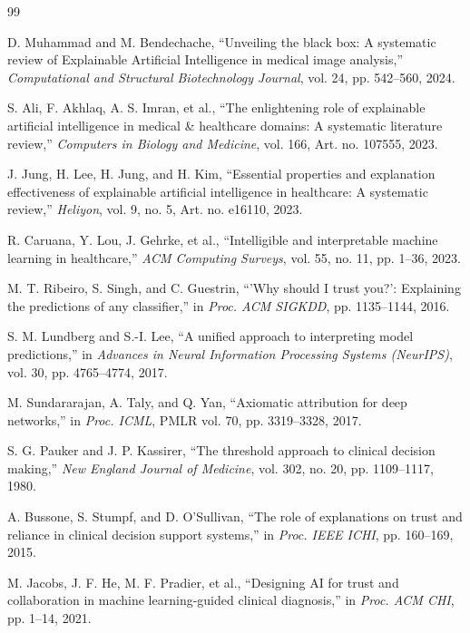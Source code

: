 \documentclass[3p,times,procedia]{elsarticle}
\theoremstyle{definition}
\begin{document}
\begin{thebibliography}{99}

D. Muhammad and M. Bendechache,
``Unveiling the black box: A systematic review of Explainable Artificial Intelligence in medical image analysis,''
\textit{Computational and Structural Biotechnology Journal},
vol. 24, pp. 542--560, 2024.

S. Ali, F. Akhlaq, A. S. Imran, et al.,
``The enlightening role of explainable artificial intelligence in medical \& healthcare domains: A systematic literature review,''
\textit{Computers in Biology and Medicine},
vol. 166, Art. no. 107555, 2023.

J. Jung, H. Lee, H. Jung, and H. Kim,
``Essential properties and explanation effectiveness of explainable artificial intelligence in healthcare: A systematic review,''
\textit{Heliyon},
vol. 9, no. 5, Art. no. e16110, 2023.

R. Caruana, Y. Lou, J. Gehrke, et al.,
``Intelligible and interpretable machine learning in healthcare,''
\textit{ACM Computing Surveys},
vol. 55, no. 11, pp. 1--36, 2023.

M. T. Ribeiro, S. Singh, and C. Guestrin,
``'Why should I trust you?': Explaining the predictions of any classifier,''
in \textit{Proc. ACM SIGKDD}, pp. 1135--1144, 2016.

S. M. Lundberg and S.-I. Lee,
``A unified approach to interpreting model predictions,''
in \textit{Advances in Neural Information Processing Systems (NeurIPS)},
vol. 30, pp. 4765--4774, 2017.

M. Sundararajan, A. Taly, and Q. Yan,
``Axiomatic attribution for deep networks,''
in \textit{Proc. ICML}, PMLR vol. 70, pp. 3319--3328, 2017.

S. G. Pauker and J. P. Kassirer,
``The threshold approach to clinical decision making,''
\textit{New England Journal of Medicine},
vol. 302, no. 20, pp. 1109--1117, 1980.

A. Bussone, S. Stumpf, and D. O'Sullivan,
``The role of explanations on trust and reliance in clinical decision support systems,''
in \textit{Proc. IEEE ICHI}, pp. 160--169, 2015.

M. Jacobs, J. F. He, M. F. Pradier, et al.,
``Designing AI for trust and collaboration in machine learning-guided clinical diagnosis,''
in \textit{Proc. ACM CHI}, pp. 1--14, 2021.


\end{thebibliography}
\end{document}
